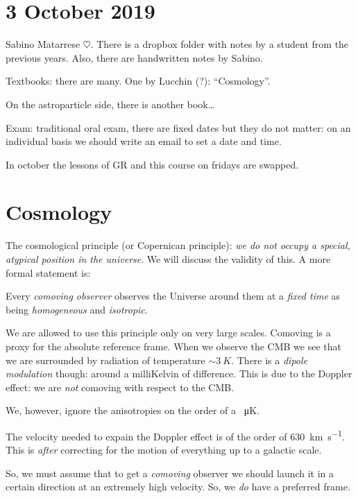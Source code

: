 \documentclass[main.tex]{subfiles}
\begin{document}
\section*{3 October 2019}

Sabino Matarrese \(\heartsuit\).
There is a dropbox folder with notes by a student from the previous years.
Also, there are handwritten notes by Sabino.

Textbooks: there are many. One by Lucchin (?): ``Cosmology''.

On the astroparticle side, there is another book\dots

Exam: traditional oral exam, there are fixed dates but they do not matter: on an individual basis we should write an email to set a date and time.

In october the lessons of GR and this course on fridays are swapped.

\section{Cosmology}

The cosmological principle (or Copernican principle): \emph{we do not occupy a special, atypical position in the universe}. We will discuss the validity of this. A more formal statement is:
%
\begin{proposition}
    Every \emph{comoving observer} observes the Universe around them at a \emph{fixed time} as being \emph{homogeneous} and \emph{isotropic}.
\end{proposition}

We are allowed to use this principle only on very large scales.
Comoving is a proxy for the absolute reference frame.
When we observe the CMB we see that we are surrounded by radiation of temperature \(\sim \SI{3}{K}\).
There is a \emph{dipole modulation} though: around a milliKelvin of difference. This is due to the Doppler effect: we are \emph{not} comoving with respect to the CMB.

We, however, ignore the anisotropies on the order of a \SI{}{\micro K}.

The velocity needed to expain the Doppler effect is of the order of \SI{630}{\kilo\metre\per\second}.
This is \emph{after} correcting for the motion of everything up to a galactic scale.

So, we must assume that to get a \emph{comoving} observer we should launch it in a certain direction at an extremely high velocity. So, we \emph{do} have a preferred frame.
\end{document}
